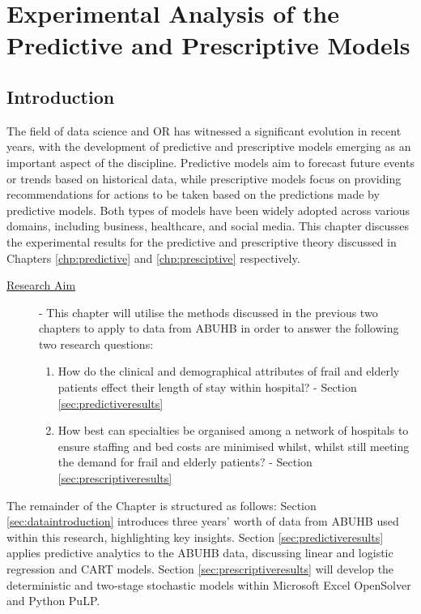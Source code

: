 \documentclass[../thesis.tex]{subfiles}
\begin{document}
\chapter{Experimental Analysis of the Predictive and Prescriptive Models}\label{chp:Experimental Analysis}
\section{Introduction}
The field of data science and OR has witnessed a significant evolution in recent years, with the development of predictive and prescriptive models emerging as an important aspect of the discipline. Predictive models aim to forecast future events or trends based on historical data, while prescriptive models focus on providing recommendations for actions to be taken based on the predictions made by predictive models. Both types of models have been widely adopted across various domains, including business, healthcare, and social media. This chapter discusses the experimental results for the predictive and prescriptive theory discussed in Chapters \ref{chp:predictive} and \ref{chp:presciptive} respectively.

\begin{description}
\item[\underline{Research Aim}] - This chapter will utilise the methods discussed in the previous two chapters to apply to data from ABUHB in order to answer the following two research questions:
\begin{enumerate}
    \item How do the clinical and demographical attributes of frail and elderly patients effect their length of stay within hospital? - Section \ref{sec:predictiveresults}
    \item How best can specialties be organised among a network of hospitals to ensure staffing and bed costs are minimised whilst, whilst still meeting the demand for frail and elderly patients? - Section \ref{sec:prescriptiveresults}
\end{enumerate}
\end{description}

The remainder of the Chapter is structured as follows: Section \ref{sec:dataintroduction} introduces three years' worth of data from ABUHB used within this research, highlighting key insights. Section \ref{sec:predictiveresults} applies predictive analytics to the ABUHB data, discussing linear and logistic regression and CART models. Section \ref{sec:prescriptiveresults} will develop the deterministic and two-stage stochastic models within Microsoft Excel OpenSolver and Python PuLP.
\end{document}
